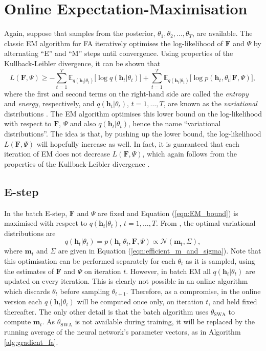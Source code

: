 \documentclass[msc,deptreport.inf]{infthesis} %
\newcommand{\matr}[1]{\mathbf{#1}}
\newcommand{\E}{\mathbb E}
\begin{document}
\section{Online Expectation-Maximisation}\label{sec:online_em}

Again, suppose that samples from the posterior, $\theta_1, \theta_2, \dots,\theta_T$, are available. The classic EM algorithm for FA iteratively optimises the log-likelihood of $\matr{F}$ and $\Psi$ by alternating ``E'' and ``M'' steps until convergence. Using properties of the Kullback-Leibler divergence, it can be shown that 
\begin{equation}\label{eqn:EM_bound}
	L(\matr{F}, \Psi) \geq 
	- \sum_{t=1}^T \E_{q(\matr{h}_t | \theta_t)} \big[\log q(\matr{h}_t | \theta_t)\big]
	+ \sum_{t=1}^T \E_{q(\matr{h}_t | \theta_t)} \big[\log p(\matr{h}_t, \theta_t | \matr{F}, \Psi)\big],
\end{equation}
where the first and second terms on the right-hand side are called the \emph{entropy} and \emph{energy}, respectively, and $q(\matr{h}_t | \theta_t)$, $t=1,\dots,T$, are known as the \emph{variational} distributions \cite{barber2007}. The EM algorithm optimises this lower bound on the log-likelihood with respect to $\matr{F}$, $\Psi$ and also $q(\matr{h}_t | \theta_t)$, hence the name ``variational distributions''. The idea is that, by pushing up the lower bound, the log-likelihood $L(\matr{F}, \Psi)$ will hopefully increase as well. In fact, it is guaranteed that each iteration of EM does not decrease $L(\matr{F}, \Psi)$, which again follows from the properties of the Kullback-Leibler divergence \cite{barber2007}.

\subsection{E-step}

In the batch E-step, $\matr{F}$ and $\Psi$ are fixed and Equation (\ref{eqn:EM_bound}) is maximised with respect to $q(\matr{h}_t | \theta_t)$, $t=1,\dots,T$. From \cite{barber2007}, the optimal variational distributions are 
\begin{equation}
	q(\matr{h}_t | \theta_t) = p(\matr{h}_t | \theta_t, \matr{F}, \Psi)  \propto \mathcal{N}(\matr{m}_t, \Sigma), 
\end{equation}
where $\matr{m}_t$ and $\Sigma$ are given in Equation (\ref{eqn:efficient_m_and_sigma}). Note that this optimisation can be performed separately for each $\theta_t$ as it is sampled, using the estimates of $\matr{F}$ and $\Psi$ on iteration $t$. However, in batch EM all $q(\matr{h}_t | \theta_t)$ are updated on every iteration. This is clearly not possible in an online algorithm which discards $\theta_t$ before sampling $\theta_{t + 1}$. Therefore, as a compromise, in the online version each $q(\matr{h}_t | \theta_t)$ will be computed once only, on iteration $t$, and held fixed thereafter. The only other detail is that the batch algorithm uses $\theta_{\text{SWA}}$ to compute $\matr{m}_t$. As $\theta_{\text{SWA}}$ is not available during training, it will be replaced by the running average of the neural network's parameter vectors, as in Algorithm \ref{alg:gradient_fa}.
\end{document}

